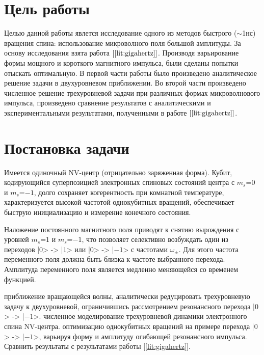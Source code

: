 \section*{Цель работы}
Целью данной работы явлется исследование одного из методов быстрого ($\sim$1нс)
вращения спина: использование микроволного поля большой амплитуды. За
основу исследования взята работа $[\ref{lit:gigahertz}]$. Производя варьирование формы мощного и короткого
магнитного импульса, были сделаны попытки отыскать оптимальную. В
первой части работы было произведено аналитическое решение задачи в
двухуровневом приближении. Во второй части произведено численное
решение трехуровневой задачи при различных формах микроволнового
импульса, произведено сравнение результатов с аналитическими и
экспериментальными результатами, полученными в работе
$[\ref{lit:gigahertz}]$.
\section*{Постановка задачи}
Имеется одиночный NV-центр (отрицательно заряженная форма). Кубит,
кодирующийся суперпозицией электронных спиновых состояний центра с
$m_s$=$0$ и $m_s$=$-1$, долго сохраняет когерентность при комнатной
температуре, характеризуется высокой частотой однокубитных вращений,
обеспечивает быструю инициализацию и измерение конечного состояния.

Наложение постоянного магнитного поля приводят к снятию вырождения с
уровней $m_s$=$1$ и $m_s$=$-1$, что позволяет селективно возбуждать один из
переходов |$0$> -> |$1$> или |$0$> -> |$-1$> с частотами
$\omega_{\pm}$. Для этого частота переменного поля должна быть близка к
частоте выбранного перехода. Амплитуда переменного поля является
медленно меняющейся со временем функцией.
\begin{enumerate}
 приближение вращающейся волны, аналитически редуцировать
трехуровневую задачу к двухуровневой, ограничившись рассмотрением
резонансного перехода |$0$> -> |$-1$>.
 численное моделирование трехуровневой динамики электронного
спина NV-центра.
 оптимизацию однокубитных вращений на примере перехода
|$0$> -> |$-1$>, варьируя форму и амплитуду огибающей резонансного
 импульса. Сравнить результаты с результатами работы [\ref{lit:gigahertz}].
\end{enumerate}

